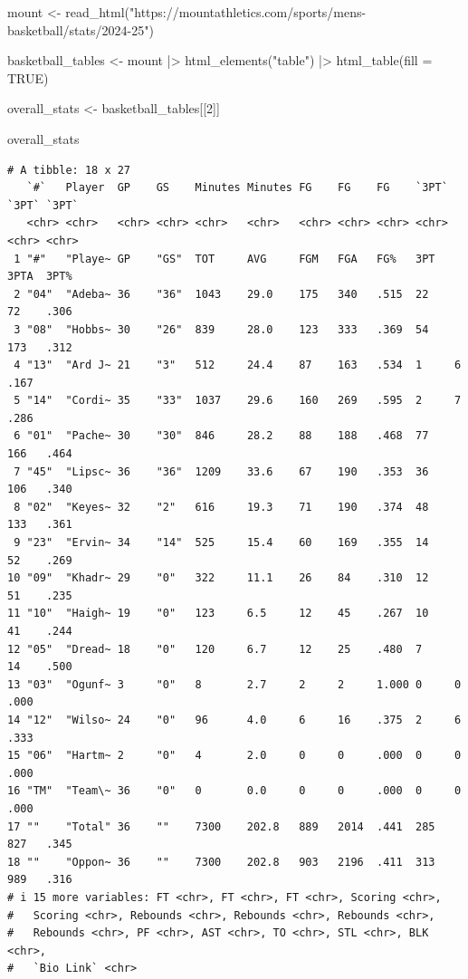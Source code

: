 \documentclass[
  letterpaper,
  DIV=11,
  numbers=noendperiod]{scrreprt}
\newenvironment{Shaded}{\begin{snugshade}}{\end{snugshade}}
\newcommand{\AttributeTok}[1]{\textcolor[rgb]{0.40,0.45,0.13}{#1}}
\newcommand{\ConstantTok}[1]{\textcolor[rgb]{0.56,0.35,0.01}{#1}}
\newcommand{\DecValTok}[1]{\textcolor[rgb]{0.68,0.00,0.00}{#1}}
\newcommand{\FunctionTok}[1]{\textcolor[rgb]{0.28,0.35,0.67}{#1}}
\newcommand{\NormalTok}[1]{\textcolor[rgb]{0.00,0.23,0.31}{#1}}
\newcommand{\OtherTok}[1]{\textcolor[rgb]{0.00,0.23,0.31}{#1}}
\newcommand{\SpecialCharTok}[1]{\textcolor[rgb]{0.37,0.37,0.37}{#1}}
\newcommand{\StringTok}[1]{\textcolor[rgb]{0.13,0.47,0.30}{#1}}
\begin{document}
\begin{Shaded}
\begin{Highlighting}[]
\NormalTok{mount }\OtherTok{\textless{}{-}} \FunctionTok{read\_html}\NormalTok{(}\StringTok{"https://mountathletics.com/sports/mens{-}basketball/stats/2024{-}25"}\NormalTok{)}

\NormalTok{basketball\_tables }\OtherTok{\textless{}{-}}\NormalTok{ mount }\SpecialCharTok{|\textgreater{}} \FunctionTok{html\_elements}\NormalTok{(}\StringTok{"table"}\NormalTok{) }\SpecialCharTok{|\textgreater{}} \FunctionTok{html\_table}\NormalTok{(}\AttributeTok{fill =} \ConstantTok{TRUE}\NormalTok{) }

\NormalTok{overall\_stats }\OtherTok{\textless{}{-}}\NormalTok{ basketball\_tables[[}\DecValTok{2}\NormalTok{]]}

\NormalTok{overall\_stats}
\end{Highlighting}
\end{Shaded}

\begin{verbatim}
# A tibble: 18 x 27
   `#`   Player  GP    GS    Minutes Minutes FG    FG    FG    `3PT` `3PT` `3PT`
   <chr> <chr>   <chr> <chr> <chr>   <chr>   <chr> <chr> <chr> <chr> <chr> <chr>
 1 "#"   "Playe~ GP    "GS"  TOT     AVG     FGM   FGA   FG%   3PT   3PTA  3PT% 
 2 "04"  "Adeba~ 36    "36"  1043    29.0    175   340   .515  22    72    .306 
 3 "08"  "Hobbs~ 30    "26"  839     28.0    123   333   .369  54    173   .312 
 4 "13"  "Ard J~ 21    "3"   512     24.4    87    163   .534  1     6     .167 
 5 "14"  "Cordi~ 35    "33"  1037    29.6    160   269   .595  2     7     .286 
 6 "01"  "Pache~ 30    "30"  846     28.2    88    188   .468  77    166   .464 
 7 "45"  "Lipsc~ 36    "36"  1209    33.6    67    190   .353  36    106   .340 
 8 "02"  "Keyes~ 32    "2"   616     19.3    71    190   .374  48    133   .361 
 9 "23"  "Ervin~ 34    "14"  525     15.4    60    169   .355  14    52    .269 
10 "09"  "Khadr~ 29    "0"   322     11.1    26    84    .310  12    51    .235 
11 "10"  "Haigh~ 19    "0"   123     6.5     12    45    .267  10    41    .244 
12 "05"  "Dread~ 18    "0"   120     6.7     12    25    .480  7     14    .500 
13 "03"  "Ogunf~ 3     "0"   8       2.7     2     2     1.000 0     0     .000 
14 "12"  "Wilso~ 24    "0"   96      4.0     6     16    .375  2     6     .333 
15 "06"  "Hartm~ 2     "0"   4       2.0     0     0     .000  0     0     .000 
16 "TM"  "Team\~ 36    "0"   0       0.0     0     0     .000  0     0     .000 
17 ""    "Total" 36    ""    7300    202.8   889   2014  .441  285   827   .345 
18 ""    "Oppon~ 36    ""    7300    202.8   903   2196  .411  313   989   .316 
# i 15 more variables: FT <chr>, FT <chr>, FT <chr>, Scoring <chr>,
#   Scoring <chr>, Rebounds <chr>, Rebounds <chr>, Rebounds <chr>,
#   Rebounds <chr>, PF <chr>, AST <chr>, TO <chr>, STL <chr>, BLK <chr>,
#   `Bio Link` <chr>
\end{verbatim}
\end{document}
